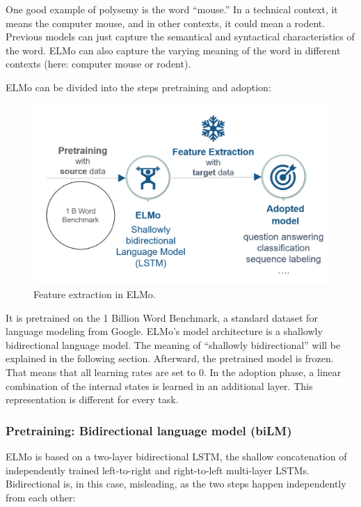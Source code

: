 \documentclass[]{krantz}
\begin{document}
One good example of polysemy is the word ``mouse.'' In a technical context, it means the computer mouse, and in other contexts, it could mean a rodent. Previous models can just capture the semantical and syntactical characteristics of the word. ELMo can also capture the varying meaning of the word in different contexts (here: computer mouse or rodent).

ELMo can be divided into the steps pretraining and adoption:

\begin{figure}

{\centering \includegraphics[width=0.6\linewidth]{figures/02-01-transfer-learning-for-nlp-1/sequential-transfer-learning-elmo} 

}

\caption{Feature extraction in ELMo.}\label{fig:ch21-figure08}
\end{figure}

It is pretrained on the 1 Billion Word Benchmark, a standard dataset for language modeling from Google. ELMo's model architecture is a shallowly bidirectional language model. The meaning of ``shallowly bidirectional'' will be explained in the following section.
Afterward, the pretrained model is frozen. That means that all learning rates are set to 0. In the adoption phase, a linear combination of the internal states is learned in an additional layer. This representation is different for every task.

\hypertarget{pretraining-bidirectional-language-model-bilm}{%
\subsubsection{Pretraining: Bidirectional language model (biLM)}\label{pretraining-bidirectional-language-model-bilm}}

ELMo is based on a two-layer bidirectional LSTM, the shallow concatenation of independently trained left-to-right and right-to-left multi-layer LSTMs. Bidirectional is, in this case, misleading, as the two steps happen independently from each other:
\end{document}
